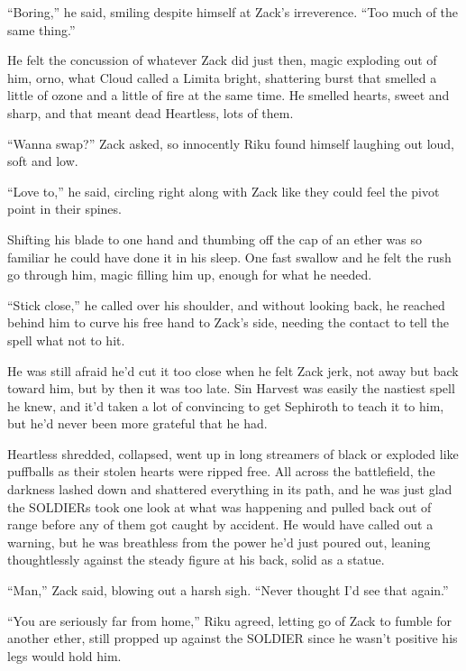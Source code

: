``Boring,'' he said, smiling despite himself at Zack's irreverence. ``Too much of the same thing.''

He felt the concussion of whatever Zack did just then, magic exploding out of him, or\textemdash no, what Cloud called a Limit\textemdash a bright, shattering burst that smelled a little of ozone and a little of fire at the same time. He smelled hearts, sweet and sharp, and that meant dead Heartless, lots of them.

``Wanna swap?'' Zack asked, so innocently Riku found himself laughing out loud, soft and low.

``Love to,'' he said, circling right along with Zack like they could feel the pivot point in their spines.

Shifting his blade to one hand and thumbing off the cap of an ether was so familiar he could have done it in his sleep. One fast swallow and he felt the rush go through him, magic filling him up, enough for what he needed.

``Stick close,'' he called over his shoulder, and without looking back, he reached behind him to curve his free hand to Zack's side, needing the contact to tell the spell what not to hit.

He was still afraid he'd cut it too close when he felt Zack jerk, not away but back toward him, but by then it was too late. Sin Harvest was easily the nastiest spell he knew, and it'd taken a lot of convincing to get Sephiroth to teach it to him, but he'd never been more grateful that he had.

Heartless shredded, collapsed, went up in long streamers of black or exploded like puffballs as their stolen hearts were ripped free. All across the battlefield, the darkness lashed down and shattered everything in its path, and he was just glad the SOLDIERs took one look at what was happening and pulled back out of range before any of them got caught by accident. He would have called out a warning, but he was breathless from the power he'd just poured out, leaning thoughtlessly against the steady figure at his back, solid as a statue.

``Man,'' Zack said, blowing out a harsh sigh. ``Never thought I'd see that again.''

``You are seriously far from home,'' Riku agreed, letting go of Zack to fumble for another ether, still propped up against the SOLDIER since he wasn't positive his legs would hold him.

